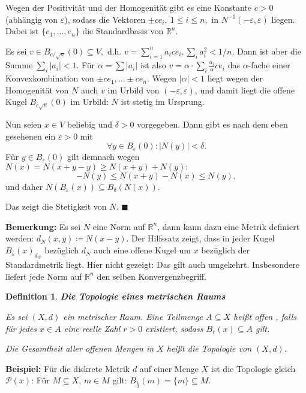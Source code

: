 \documentclass[12pt]{scrbook}   %
\newtheorem{definiX}[alles]{Definition}
\newenvironment{defini}[1]{\begin{definiX}{\bf #1}\par\rm}{\end{definiX}}
\newcommand{\da}{\coloneqq}
\begin{document}
Wegen der Positivität und der Homogenität gibt es eine Konstante $c>0$ 
(abhän\-gig von $\varepsilon$), sodass die Vektoren 
$\pm c e_i,\ 1\leq i\leq n,$
in $N^{-1}(-\varepsilon , \varepsilon)$ liegen. Dabei ist $\{e_1,\dots ,e_n\}$ 
die Standardbasis von $\mathbb R^n.$

Es sei $v\in B_{c/\sqrt n}(0)\subseteq V,$ d.h. $v= \sum_{i=1}^n a_i c e_i, 
\sum_i a_i^2 < 1/n.$ Dann ist aber die Summe $\sum_i|a_i| < 1.$ Für
$\alpha = \sum |a_i|$ ist also $v=\alpha\cdot \sum_i \frac{a_i}{\alpha}
ce_i$ das $\alpha$-fache einer Konvexkombination 
von $\pm ce_1,\dots \pm ce_n.$ Wegen  $|\alpha|<1$ liegt wegen der 
Homogenität von $N$ auch $v$ im Urbild von $(-\varepsilon, \varepsilon)$, und
damit liegt die offene Kugel $B_{c\sqrt n}(0)$ im Urbild: $N$ ist stetig im 
Ursprung. 

Nun seien $x\in V$ beliebig und $\delta>0$ vorgegeben. Dann gibt es nach dem 
eben gesehenen ein $\varepsilon>0$ mit 
$$\forall y\in B_\varepsilon (0) : |N(y)| < \delta.$$
Für $y\in B_\varepsilon (0)$ gilt demnach wegen
$N(x) = N(x+y-y)\geq N(x+y) + N(y):$
$$-N(y) \leq  N(x+y) - N(x) \leq N(y),$$
und daher $N(B_\varepsilon(x)) \subseteq B_\delta(N(x)).$ 
\nopagebreak

Das zeigt die Stetigkeit von $N.$ \hfill{$\blacksquare$}

{\bf Bemerkung:} Es sei $N$ eine Norm auf $\mathbb R^n$, dann kann dazu eine Metrik definiert werden: $d_N(x,y) \da N(x-y)$. Der Hilfssatz zeigt, dass in jeder Kugel $B_\varepsilon(x)_{d_N}$ bezüglich $d_N$ auch eine offene Kugel um $x$ bezüglich der Standardmetrik liegt. Hier nicht gezeigt: Das gilt auch umgekehrt. Insbesondere liefert jede Norm auf $\mathbb R^n$ den selben Konvergenzbegriff.

\begin{defini}{Die Topologie eines metrischen Raums}
Es sei $(X,d)$ ein metrischer Raum. Eine Teilmenge $A\subseteq X$ heißt
{\it offen} , falls für jedes $x\in A$ eine reelle Zahl $r>0$
existiert, sodass $B_r(x)\subseteq A$ gilt. 

Die Gesamtheit aller offenen Mengen in $X$ heißt die {\it Topologie} von 
$(X,d).$
\end{defini}

{\bf Beispiel:} Für die diskrete Metrik $d$ auf einer Menge $X$ ist die Topologie gleich $\mathcal P(x)$: Für $M\subseteq X$, $m\in M$ gilt: $B_{\frac{1}{2}}(m) = \{m\} \subseteq M$.
\end{document}
